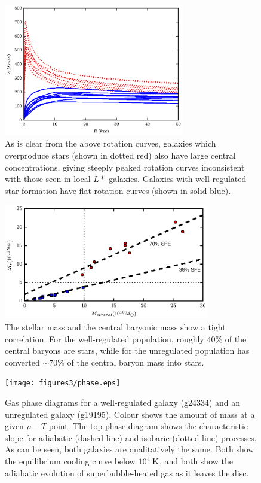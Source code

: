 \begin{figure}
    \includegraphics[width=0.7\textwidth]{figures3/rotcurve.eps}
    \caption[MUGS2 rotation curves]{As is clear from the above rotation curves,
    galaxies which overproduce stars (shown in dotted red) also have large
    central concentrations, giving steeply peaked rotation curves inconsistent
    with those seen in local $L*$ galaxies.  Galaxies with well-regulated star
    formation have flat rotation curves (shown in solid blue).}
    \label{rotation_curve3}
\end{figure}
\begin{figure}
    \includegraphics[width=0.8\textwidth]{figures3/stellar_central.eps}
    \caption[Stellar mass vs. central baryonic mass in MUGS2 galaxies]{The stellar mass and the central baryonic mass show a tight
        correlation.  For the well-regulated population, roughly $40\%$ of the
        central baryons are stars, while for the unregulated population has
        converted $\sim70\%$ of the central baryon mass into stars.}
    \label{stellar_central3}
\end{figure}
\begin{figure}
    \texttt{[image: figures3/phase.eps]}
    \caption[Gas phase diagram in two MUGS2 galaxies]{Gas phase diagrams for a
    well-regulated galaxy (g24334) and an unregulated galaxy (g19195).  Colour
    shows the amount of mass at a given $\rho-T$ point.  The top phase diagram
    shows the characteristic slope for adiabatic (dashed line) and isobaric
    (dotted line) processes.  As can be seen, both galaxies are qualitatively
    the same.  Both show the equilibrium cooling curve below $10^4\>{\rm K}$, and both
    show the adiabatic evolution of superbubble-heated gas as it leaves the
    disc.}
    \label{phase3}
\end{figure}

